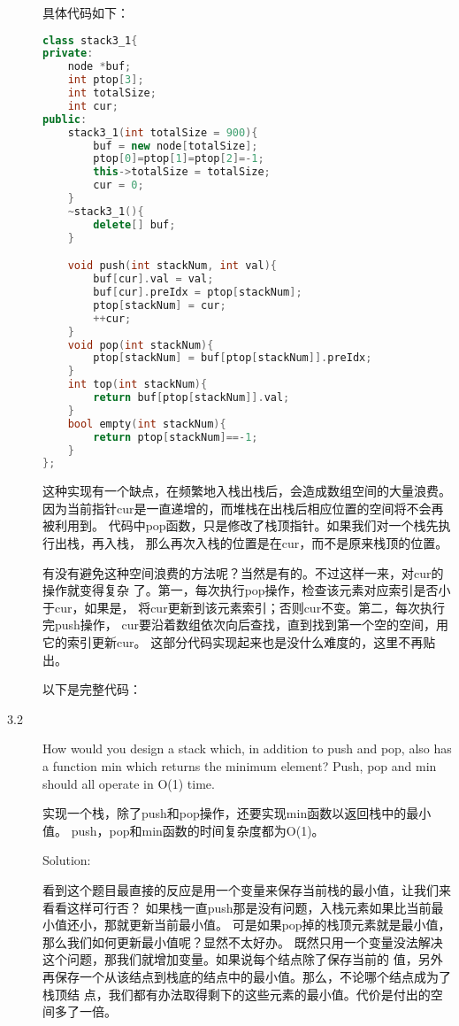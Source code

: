 \begin{description}
具体代码如下：

\begin{lstlisting}[language=C++]
class stack3_1{
private:
    node *buf;
    int ptop[3];
    int totalSize;
    int cur;
public:
    stack3_1(int totalSize = 900){
        buf = new node[totalSize];
        ptop[0]=ptop[1]=ptop[2]=-1;
        this->totalSize = totalSize;
        cur = 0;
    }
    ~stack3_1(){
        delete[] buf;
    }

    void push(int stackNum, int val){
        buf[cur].val = val;
        buf[cur].preIdx = ptop[stackNum];
        ptop[stackNum] = cur;
        ++cur;
    }
    void pop(int stackNum){
        ptop[stackNum] = buf[ptop[stackNum]].preIdx;
    }
    int top(int stackNum){
        return buf[ptop[stackNum]].val;
    }
    bool empty(int stackNum){
        return ptop[stackNum]==-1;
    }
};
\end{lstlisting}

这种实现有一个缺点，在频繁地入栈出栈后，会造成数组空间的大量浪费。 因为当前指针cur是一直递增的，而堆栈在出栈后相应位置的空间将不会再被利用到。 代码中pop函数，只是修改了栈顶指针。如果我们对一个栈先执行出栈，再入栈， 那么再次入栈的位置是在cur，而不是原来栈顶的位置。

有没有避免这种空间浪费的方法呢？当然是有的。不过这样一来，对cur的操作就变得复杂 了。第一，每次执行pop操作，检查该元素对应索引是否小于cur，如果是， 将cur更新到该元素索引；否则cur不变。第二，每次执行完push操作， cur要沿着数组依次向后查找，直到找到第一个空的空间，用它的索引更新cur。 这部分代码实现起来也是没什么难度的，这里不再贴出。

以下是完整代码：




\item[3.2] How would you design a stack which, in addition to push and pop, also has a function min which returns the minimum element? Push, pop and min should all operate in O(1) time.

实现一个栈，除了push和pop操作，还要实现min函数以返回栈中的最小值。 push，pop和min函数的时间复杂度都为O(1)。

Solution: 

看到这个题目最直接的反应是用一个变量来保存当前栈的最小值，让我们来看看这样可行否？ 如果栈一直push那是没有问题，入栈元素如果比当前最小值还小，那就更新当前最小值。 可是如果pop掉的栈顶元素就是最小值，那么我们如何更新最小值呢？显然不太好办。 既然只用一个变量没法解决这个问题，那我们就增加变量。如果说每个结点除了保存当前的 值，另外再保存一个从该结点到栈底的结点中的最小值。那么，不论哪个结点成为了栈顶结 点，我们都有办法取得剩下的这些元素的最小值。代价是付出的空间多了一倍。


\end{description}
